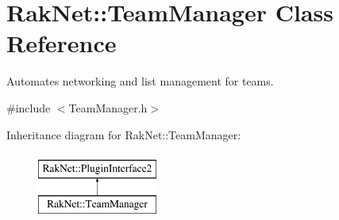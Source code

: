 \hypertarget{class_rak_net_1_1_team_manager}{\section{Rak\-Net\-:\-:Team\-Manager Class Reference}
\label{class_rak_net_1_1_team_manager}
}


Automates networking and list management for teams.  




{\ttfamily \#include $<$Team\-Manager.\-h$>$}

Inheritance diagram for Rak\-Net\-:\-:Team\-Manager\-:\begin{figure}[H]
\begin{center}
\leavevmode
\includegraphics[height=2.000000cm]{class_rak_net_1_1_team_manager}
\end{center}
\end{figure}
